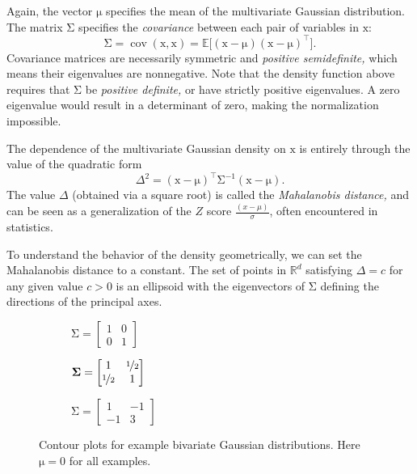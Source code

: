 \documentclass{article}
\newcommand{\inv}{^{-1}}
\newcommand{\trans}{^\top}
\newcommand{\mat}[1]{\bm{\mathrm{#1}}}
\renewcommand{\vec}[1]{\bm{\mathrm{#1}}}
\newcommand{\R}{\mathbb{R}}
\DeclareMathOperator{\cov}{cov}
\begin{document}
Again, the vector $\vec{\mu}$ specifies the mean of the multivariate
Gaussian distribution.  The matrix $\mat{\Sigma}$ specifies the
\emph{covariance} between each pair of variables in $\vec{x}$:
\begin{equation*}
  \mat{\Sigma}
  =
  \cov(\vec{x}, \vec{x})
  =
  \mathbb{E}\bigl[(\vec{x} - \vec{\mu})(\vec{x} - \vec{\mu})\trans\bigr].
\end{equation*}
Covariance matrices are necessarily symmetric and \emph{positive
  semidefinite,} which means their eigenvalues are nonnegative.  Note
that the density function above requires that $\mat{\Sigma}$ be
\emph{positive definite,} or have strictly positive eigenvalues.  A
zero eigenvalue would result in a determinant of zero, making the
normalization impossible.

The dependence of the multivariate Gaussian density on $\vec{x}$ is
entirely through the value of the quadratic form
\begin{equation*}
  \Delta^2
  =
  (\vec{x} - \vec{\mu})\trans
  \mat{\Sigma}\inv
  (\vec{x} - \vec{\mu}).
\end{equation*}
The value $\Delta$ (obtained via a square root) is called the
\emph{Mahalanobis distance,} and can be seen as a generalization of
the $Z$ score $\frac{(x - \mu)}{\sigma}$, often encountered in
statistics.

To understand the behavior of the density geometrically, we can set
the Mahalanobis distance to a constant. The set of points in $\R^d$
satisfying $\Delta = c$ for any given value $c > 0$ is an ellipsoid
with the eigenvectors of $\mat{\Sigma}$ defining the directions of the
principal axes.

\begin{figure}
  \begin{subfigure}{0.33\textwidth}
    
    \caption{$\mat{\Sigma} = \begin{bmatrix} 1 & 0 \\ 0 & 1 \end{bmatrix}$}
    \label{2d_example_1}
  \end{subfigure}
  \begin{subfigure}{0.33\textwidth}
    
    \caption{$\mat{\Sigma} = \begin{bmatrix} 1 & \nicefrac{1}{2} \\ \nicefrac{1}{2} & 1 \end{bmatrix}$}
  \end{subfigure}
  \begin{subfigure}{0.33\textwidth}
    
    \caption{$\mat{\Sigma} = \begin{bmatrix} 1 & -1 \\ -1 & 3 \end{bmatrix}$}
    \label{2d_example_3}
  \end{subfigure}
  \caption{Contour plots for example bivariate Gaussian distributions.
    Here $\vec{\mu} = \vec{0}$ for all examples.}
  \label{2d_examples}
\end{figure}
\end{document}

